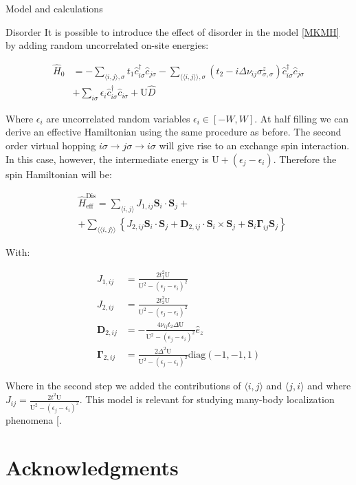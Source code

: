 \documentclass[aps,prl,twocolumn,amsmath,amssymb,superscriptaddress,nobibnotes]{revtex4}%
\renewcommand{\cite}[1]{{[}\onlinecite{#1}{]}}
\newcommand{\n}{\nonumber}
\newcommand{\bs}{\boldsymbol}
\begin{document}
\begin{section}{Model and calculations}
\begin{subsection}{Disorder}
It is possible to introduce the effect of disorder in the model \ref{MKMH} by adding random uncorrelated on-site energies:

\begin{align}
\label{DisorderedHubbardModel}
\hat{H}_0 &= - \sum_{\langle i,j \rangle, \sigma} t_1\hat{c}_{i \sigma}^\dagger \hat{c}_{j \sigma} -\sum_{\langle \langle i,j \rangle \rangle, \sigma}(t_2 - i\Delta\nu_{ij}\sigma^z_{\sigma, \sigma})\hat{c}_{i \sigma}^\dagger \hat{c}_{j \sigma} \n \\
	& + \sum_{i \sigma} \epsilon_i \hat{c}_{i \sigma}^\dagger \hat{c}_{i \sigma} +
	\text{U}\hat{D}
\end{align}

Where $\epsilon_i$ are uncorrelated random variables $\epsilon_i \in [-W,W]$. At half filling we can derive an effective Hamiltonian using the same procedure as before. The second order virtual hopping $i\sigma \rightarrow j\sigma \rightarrow i\sigma$ will give rise to an exchange spin interaction. In this case, however, the intermediate energy is $\text{U} + (\epsilon_j - \epsilon_i)$. Therefore the spin Hamiltonian will be:

\begin{align}
&\hat{H}_{\text{eff}}^{\text{Dis}} = \sum_{\langle i,j \rangle} J_{1,ij}\bs{S}_i\cdot\bs{S}_j +\n \\
&+ \sum_{\langle \langle i,j \rangle \rangle} \left\{ J_{2,ij}\bs{S}_i\cdot\bs{S}_j + \bs{D}_{2,ij}\cdot \bs{S}_i \times \bs{S}_j + \bs{S}_i \bs{\Gamma}_{ij} \bs{S}_j \right\}
\end{align}

With:

\begin{align*}
J_{1,ij} &= \frac{2t_1^2\text{U}}{\text{U}^2-(\epsilon_j-\epsilon_i)^2} \\
J_{2,ij} &= \frac{2t_2^2\text{U}}{\text{U}^2-(\epsilon_j-\epsilon_i)^2} \\
\bs{D}_{2,ij} &= -\frac{4\nu_{ij} t_2 \Delta \text{U}}{\text{U}^2-(\epsilon_j-\epsilon_i)^2}\hat{e}_z \\
\bs{\Gamma}_{2,ij} &= \frac{2\Delta^2\text{U}}{\text{U}^2-(\epsilon_j-\epsilon_i)^2}\text{diag}(-1,-1,1)
\end{align*}

Where in the second step we added the contributions of $\langle i,j \rangle$ and $\langle j,i \rangle$ and where $J_{ij} = \frac{2t^2\text{U}}{\text{U}^2-(\epsilon_j-\epsilon_i)^2}$. This model is relevant for studying many-body localization phenomena \cite{Protopopov2018}.
\end{subsection}

\end{section}

\section*{Acknowledgments}


\end{document}
